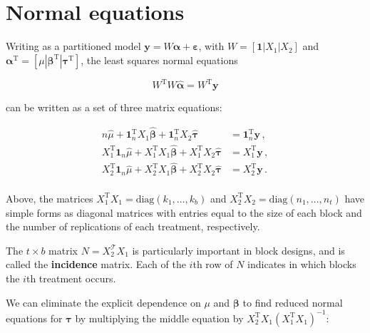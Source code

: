 \documentclass[
]{book}
\theoremstyle{definition}
\theoremstyle{definition}
\theoremstyle{definition}
\theoremstyle{definition}
\theoremstyle{remark}
\begin{document}
\hypertarget{normal-equations}{%
\section{Normal equations}\label{normal-equations}}

Writing as a partitioned model \(\boldsymbol{y}= W\boldsymbol{\alpha} + \boldsymbol{\varepsilon}\), with \(W = [\boldsymbol{1} | X_1 | X_2]\) and \(\boldsymbol{\alpha}^{\mathrm{T}} = [\mu | \boldsymbol{\beta}^{\mathrm{T}} | \boldsymbol{\tau}^{\mathrm{T}}]\), the least squares normal equations

\begin{equation}
W^{\mathrm{T}}W \hat{\boldsymbol{\alpha}} = W^{\mathrm{T}}\boldsymbol{y}
\label{eq:bne}
\end{equation}

can be written as a set of three matrix equations:

\begin{align}
n\hat{\mu} + \boldsymbol{1}_n^{\mathrm{T}}X_1\hat{\boldsymbol{\beta}} + \boldsymbol{1}_n^{\mathrm{T}}X_2\hat{\boldsymbol{\tau}} & = \boldsymbol{1}_n^{\mathrm{T}}\boldsymbol{y}\,, \\
X_1^{\mathrm{T}}\boldsymbol{1}_n\hat{\mu} + X_1^{\mathrm{T}}X_1\hat{\boldsymbol{\beta}} + X_1^{\mathrm{T}}X_2\hat{\boldsymbol{\tau}} & = X_1^{\mathrm{T}}\boldsymbol{y}\,, \\
X_2^{\mathrm{T}}\boldsymbol{1}_n\hat{\mu} + X_2^{\mathrm{T}}X_1\hat{\boldsymbol{\beta}} + X_2^{\mathrm{T}}X_2\hat{\boldsymbol{\tau}} & = X_2^{\mathrm{T}}\boldsymbol{y}\,. \\
\end{align}

Above, the matrices \(X_1^{\mathrm{T}}X_1 = \mathrm{diag}(k_1,\ldots,k_b)\) and \(X_2^{\mathrm{T}}X_2 = \mathrm{diag}(n_1,\ldots,n_t)\) have simple forms as diagonal matrices with entries equal to the size of each block and the number of replications of each treatment, respectively.

The \(t\times b\) matrix \(N = X_2^{\mathcal{T}}X_1\) is particularly important in block designs, and is called the \textbf{incidence} matrix. Each of the \(i\)th row of \(N\) indicates in which blocks the \(i\)th treatment occurs.

We can eliminate the explicit dependence on \(\mu\) and \(\boldsymbol{\beta}\) to find reduced normal equations for \(\boldsymbol{\tau}\) by multiplying the middle equation by \(X_2^{\mathrm{T}}X_1(X_1^{\mathrm{T}}X_1)^{-1}\):
\end{document}
